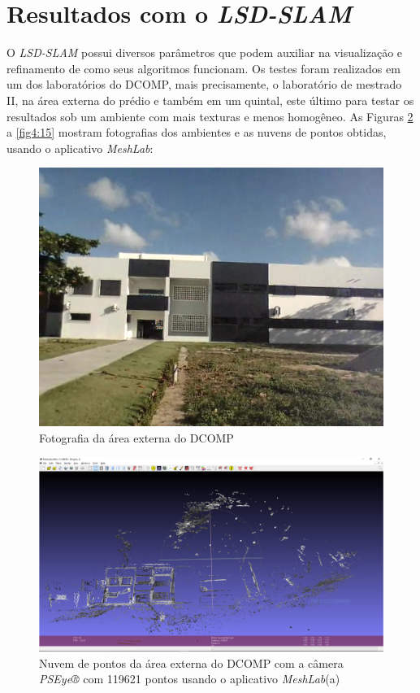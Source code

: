 \section{Resultados com o \textit{LSD-SLAM}}

O \textit{LSD-SLAM} possui diversos parâmetros que podem auxiliar na visualização e refinamento de como seus algoritmos funcionam. Os testes foram realizados em um dos laboratórios do DCOMP, mais precisamente, o laboratório de mestrado II, na área externa do prédio e também em um quintal, este último para testar os resultados sob um ambiente com mais texturas e menos homogêneo. As Figuras \ref{fig4:5} a \ref{fig4:15} mostram fotografias dos ambientes e as nuvens de pontos obtidas, usando o aplicativo \textit{MeshLab}:

\begin{figure}[H]
	\centering
		\includegraphics[width= \textwidth]{Imagens/figura4-7.jpg}
	\caption{Fotografia da área externa do DCOMP}
	\label{fig4:7}
\end{figure}

\begin{figure}[H]
	\centering
		\includegraphics[width= \textwidth]{Imagens/figura4-5.jpg}
	\caption{Nuvem de pontos da área externa do DCOMP com a câmera \textit{PSEye®} com 119621 pontos usando o aplicativo \textit{MeshLab}(a)}
	\label{fig4:5}
\end{figure}

